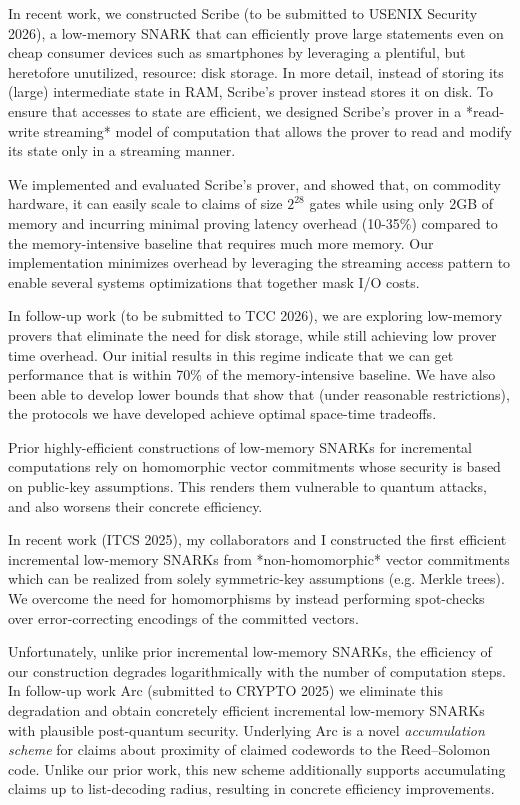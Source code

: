 \documentclass[11pt,letterpaper]{article}
\theoremstyle{definition} %
\theoremstyle{remark} %
\begin{document}
In recent work, we constructed Scribe (to be submitted to USENIX Security 2026), a low-memory SNARK that can efficiently prove large statements even on cheap consumer devices such as smartphones by leveraging a plentiful, but heretofore unutilized, resource: disk storage. 
In more detail, instead of storing its (large) intermediate state in RAM, Scribe's prover instead stores it on disk. 
To ensure that accesses to state are efficient, we designed Scribe's prover in a *read-write streaming* model of computation that allows the prover to read and modify its state only in a streaming manner.

We implemented and evaluated Scribe's prover, and showed that, on commodity hardware, it can easily scale to claims of size $2^{28}$ gates while using only 2GB of memory and incurring minimal proving latency overhead (10-35\%) compared to the memory-intensive baseline that requires much more memory. 
Our implementation minimizes overhead by leveraging the streaming access pattern to enable several systems optimizations that together mask I/O costs.

In follow-up work (to be submitted to TCC 2026), we are exploring low-memory provers that eliminate the need for disk storage, while still achieving low prover time overhead.
Our initial results in this regime indicate that we can get performance that is within 70\% of the memory-intensive baseline.
We have also been able to develop lower bounds that show that (under reasonable restrictions), the protocols we have developed achieve optimal space-time tradeoffs.

Prior highly-efficient constructions of low-memory SNARKs for incremental computations \cite{BunzCLMS21,KothapalliST22} rely on homomorphic vector commitments whose security is based on public-key assumptions.
This renders them vulnerable to quantum attacks, and also worsens their concrete efficiency.

In recent work \cite{BunzMNW25} (ITCS 2025), my collaborators and I constructed the first efficient incremental low-memory SNARKs from *non-homomorphic* vector commitments which can be realized from solely symmetric-key assumptions (e.g. Merkle trees).
We overcome the need for homomorphisms by instead performing spot-checks over error-correcting encodings of the committed vectors.

Unfortunately, unlike prior incremental low-memory SNARKs, the efficiency of our construction degrades logarithmically with the number of computation steps. 
In follow-up work Arc \cite{BunzMNW24} (submitted to CRYPTO 2025) we eliminate this degradation and obtain concretely efficient incremental low-memory SNARKs with plausible post-quantum security.
Underlying Arc is a novel \emph{accumulation scheme} \cite{BunzCLMS21,KothapalliST22} for claims about proximity of claimed codewords to the Reed--Solomon code. 
Unlike our prior work, this new scheme additionally supports accumulating claims up to list-decoding radius, resulting in concrete efficiency improvements.
\end{document}

